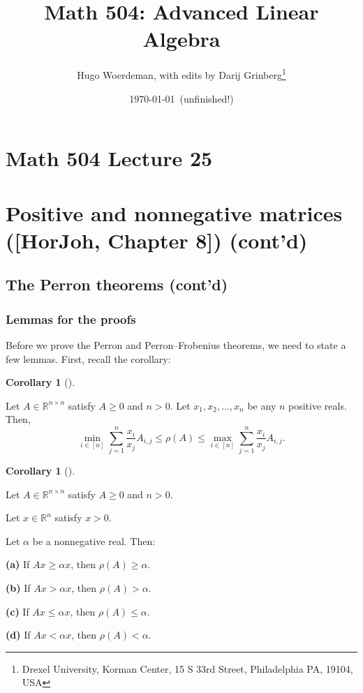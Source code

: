 \documentclass[numbers=enddot,12pt,final,onecolumn,notitlepage]{scrartcl}%
\numberwithin{exer}{subsection}
\theoremstyle{definition}
\newtheorem{coro}[theo]{Corollary}
\newenvironment{corollary}[1][]
{\begin{coro}[#1]\begin{leftbar}}
{\end{leftbar}\end{coro}}
\let\sumnonlimits\sum
\renewcommand{\sum}{\sumnonlimits\limits}
\begin{document}
\title{Math 504: Advanced Linear Algebra}
\author{Hugo Woerdeman, with edits by Darij Grinberg\thanks{Drexel University, Korman
Center, 15 S 33rd Street, Philadelphia PA, 19104, USA}}
\date{\today\ (unfinished!)}
\maketitle
\tableofcontents

\section*{Math 504 Lecture 25}

\section{Positive and nonnegative matrices ([HorJoh, Chapter 8]) (cont'd)}

\subsection{The Perron theorems (cont'd)}

\subsubsection{Lemmas for the proofs}

Before we prove the Perron and Perron--Frobenius theorems, we need to state a
few lemmas. First, recall the corollary:

\begin{corollary}
\label{cor.posmat.rho-in-terms-of-rowsums-x}Let $A\in\mathbb{R}^{n\times n}$
satisfy $A\geq0$ and $n>0$. Let $x_{1},x_{2},\ldots,x_{n}$ be any $n$ positive
reals. Then,%
\[
\min\limits_{i\in\left[  n\right]  }\sum_{j=1}^{n}\dfrac{x_{i}}{x_{j}}%
A_{i,j}\leq\rho\left(  A\right)  \leq\max\limits_{i\in\left[  n\right]  }%
\sum_{j=1}^{n}\dfrac{x_{i}}{x_{j}}A_{i,j}.
\]

\end{corollary}

\begin{corollary}
Let $A\in\mathbb{R}^{n\times n}$ satisfy $A\geq0$ and $n>0$.

Let $x\in\mathbb{R}^{n}$ satisfy $x>0$.

Let $\alpha$ be a nonnegative real. Then:

\textbf{(a)} If $Ax\geq\alpha x$, then $\rho\left(  A\right)  \geq\alpha$.

\textbf{(b)} If $Ax>\alpha x$, then $\rho\left(  A\right)  >\alpha$.

\textbf{(c)} If $Ax\leq\alpha x$, then $\rho\left(  A\right)  \leq\alpha$.

\textbf{(d)} If $Ax<\alpha x$, then $\rho\left(  A\right)  <\alpha$.
\end{corollary}
\end{document}
